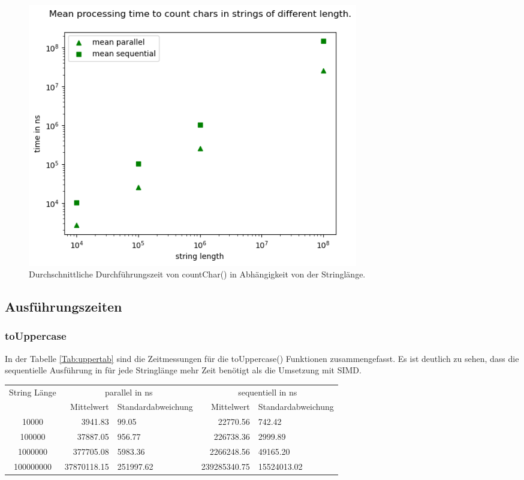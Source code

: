 \documentclass[plainarticle,zihtitle,german,final,hyperref,utf8]{zihpub}
\begin{document}
\begin{figure}[h]
	\begin{center}
		\includegraphics[width=0.7\textwidth]{images/complex_count.png}
		\caption{Durchschnittliche Durchführungszeit von countChar() in Abhängigkeit von der Stringlänge.}
		\label{fig:mean_upper}
	\end{center}
\end{figure}


\subsection{Ausführungszeiten}
\subsubsection{toUppercase}
In der Tabelle \ref{Tab:uppertab} sind die Zeitmessungen für die toUppercase() Funktionen zusammengefasst.
Es ist deutlich zu sehen, dass die se­quen­ti­elle Ausführung in für jede Stringlänge mehr Zeit benötigt als die Umsetzung mit SIMD.
\newline
\begin{tabular}{|c|r|l|r|l|}
	\hline
	\multicolumn{1}{|c|}{String Länge} & \multicolumn{2}{c|}{parallel in ns} & \multicolumn{2}{c|}{se­quen­tiell­ in ns} \\
	\cline{2-5}
	& Mittelwert & Standardabweichung  & Mittelwert & Standardabweichung \\
	\hline
	10000 & 3941.83 & 99.05 & 22770.56 & 742.42 \\
	100000 & 37887.05 & 956.77 & 226738.36 & 2999.89 \\
	1000000 & 377705.08 & 5983.36 & 2266248.56 & 49165.20 \\
	100000000 & 37870118.15 & 251997.62 & 239285340.75 & 15524013.02 \\
	\hline
\end{tabular}
\label{Tab:uppertab}
\end{document}
